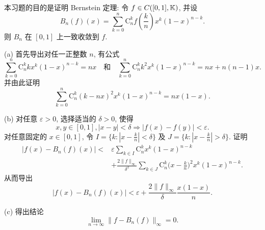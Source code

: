 \begin{exercise}
    本习题的目的是证明 Bernstein 定理: 令 $f\in C([0,1], \mathbb{K})$, 并设
    \[
    B_{n}(f)(x)=\sum_{k=0}^{n} \mathrm{C}_{n}^{k} f\left(\frac{k}{n}\right) x^{k}(1-x)^{n-k}.
    \]
    则 $B_{n}$ 在 $[0,1]$ 上一致收敛到 $f$.

    (a) 首先导出对任一正整数 $n$, 有公式
    \[
    \sum_{k=0}^{n} \mathrm{C}_{n}^{k} k x^{k}(1-x)^{n-k}=nx \quad\text{和}\quad\sum_{k=0}^{n} \mathrm{C}_{n}^{k} k^2 x^k(1-x)^{n-k}=nx+n(n-1)x.
    \]
    并由此证明
    \[
    \sum_{k=0}^{n} \mathrm{C}_{n}^{k}(k-nx)^2 x^k (1-x)^{n-k}=nx(1-x).
    \]

    (b) 对任意 $\varepsilon>0$, 选择适当的 $\delta>0$, 使得
    \[
    x, y \in[0,1],|x-y|<\delta \Rightarrow|f(x)-f(y)|<\varepsilon.
    \]
    对任意固定的 $x\in [0,1]$, 令 $I=\{k:|x-\frac{k}{n}|<\delta\}$
    及 $J=\{k:|x-\frac{k}{n}|>\delta\}$. 证明
    \begin{align*}
        |f(x)-B_n(f)(x)|<{}
        & \varepsilon\sum_{k\in I}\mathrm{C}_n^k x^k(1-x)^{n-k} \\
        & +\frac{2\|f\|_{\infty}}{\delta^2}\sum_{k\in J}\mathrm{C}_n^k \biggl(x-\frac{k}{n}\biggr)^2x^k(1-x)^{n-k}.
    \end{align*}
    从而导出
    \[|f(x)-B_n(f)(x)|<\varepsilon+\frac{2\|f\|_{\infty}}{\delta}\frac{x(1-x)}{n}.\]

    (c) 得出结论
    \[\lim_{n\to\infty}\|f-B_n(f)\|_{\infty}=0.\]
\end{exercise}

